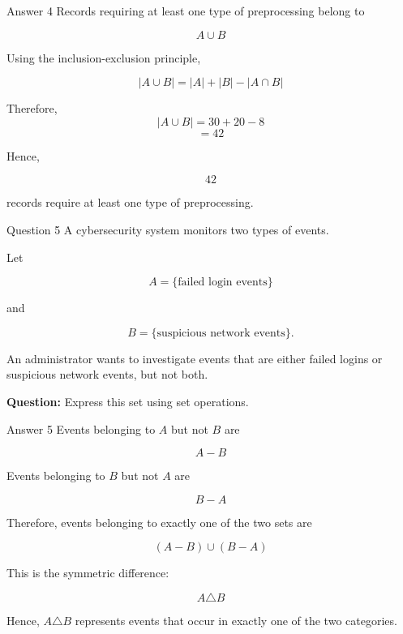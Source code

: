 \begin{frame}{Answer 4}
Records requiring at least one type of preprocessing belong to

$$
A\cup B
$$

Using the inclusion-exclusion principle,

$$
|A\cup B|
=
|A|+|B|-|A\cap B|
$$

Therefore,
$$
|A\cup B|
=
30+20-8
$$
$$
=42
$$

Hence,

$$
\boxed{42}
$$

records require at least one type of preprocessing.
\end{frame}


\begin{frame}{Question 5}
A cybersecurity system monitors two types of events.

Let

$$
A=\{\text{failed login events}\}
$$

and

$$
B=\{\text{suspicious network events}\}.
$$

An administrator wants to investigate events that are either failed logins or suspicious network events, but not both.

\textbf{Question:} Express this set using set operations.
\end{frame}

\begin{frame}{Answer 5}
Events belonging to $A$ but not $B$ are

$$
A-B
$$

Events belonging to $B$ but not $A$ are

$$
B-A
$$

Therefore, events belonging to exactly one of the two sets are

$$
(A-B)\cup(B-A)
$$

This is the symmetric difference:

$$
\boxed{A\triangle B}
$$

Hence, $A\triangle B$ represents events that occur in exactly one of the two categories.
\end{frame}
